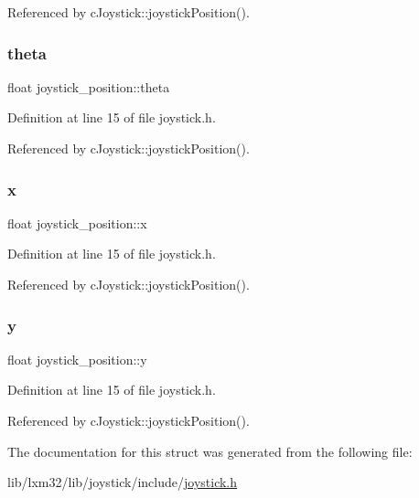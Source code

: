 Referenced by c\+Joystick\+::joystick\+Position().

\mbox{\label{structjoystick__position_ad738e8acb3656438c10d2ec7670639e5}} 
\subsubsection{\texorpdfstring{theta}{theta}}
{\footnotesize\ttfamily float joystick\+\_\+position\+::theta}



Definition at line 15 of file joystick.\+h.



Referenced by c\+Joystick\+::joystick\+Position().

\mbox{\label{structjoystick__position_a71c3292c1be3c3400a388eac41a47ad3}} 
\subsubsection{\texorpdfstring{x}{x}}
{\footnotesize\ttfamily float joystick\+\_\+position\+::x}



Definition at line 15 of file joystick.\+h.



Referenced by c\+Joystick\+::joystick\+Position().

\mbox{\label{structjoystick__position_ad8fc27fbd5404a4f8cdc1a045a0d689a}} 
\subsubsection{\texorpdfstring{y}{y}}
{\footnotesize\ttfamily float joystick\+\_\+position\+::y}



Definition at line 15 of file joystick.\+h.



Referenced by c\+Joystick\+::joystick\+Position().



The documentation for this struct was generated from the following file\+:\begin{DoxyCompactItemize}
\item 
lib/lxm32/lib/joystick/include/\hyperlink{joystick_8h}{joystick.\+h}\end{DoxyCompactItemize}
